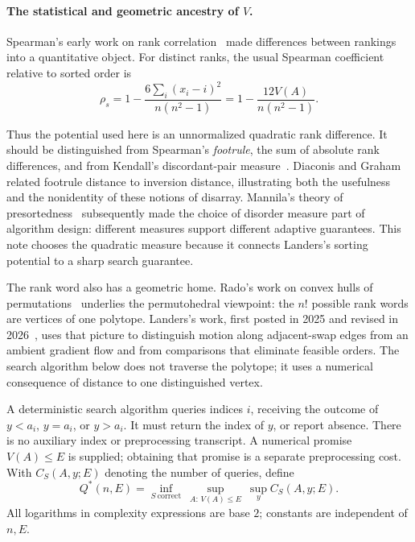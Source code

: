 \documentclass[10pt,letterpaper]{article}
\begin{document}
\begin{samepage}
\paragraph{The statistical and geometric ancestry of $V$.}
Spearman's early work on rank correlation~\cite{spearman} made differences between
rankings into a quantitative object. For distinct ranks, the usual Spearman
coefficient relative to sorted order is
\begin{equation}
 \rho_s=1-\frac{6\sum_i(x_i-i)^2}{n(n^2-1)}
       =1-\frac{12V(A)}{n(n^2-1)}. \label{eq:spearman}
\end{equation}
\end{samepage}
Thus the potential used here is an unnormalized quadratic rank difference. It
should be distinguished from Spearman's \emph{footrule}, the sum of absolute
rank differences, and from Kendall's discordant-pair measure~\cite{kendall}.
Diaconis and Graham~\cite{diaconis} related footrule distance to inversion
distance, illustrating both the usefulness and the nonidentity of these notions
of disarray. Mannila's theory of presortedness~\cite{mannila} subsequently made
the choice of disorder measure part of algorithm design: different measures
support different adaptive guarantees. This note chooses the quadratic measure
because it connects Landers's sorting potential to a sharp search guarantee.

The rank word also has a geometric home. Rado's work on convex hulls of
permutations~\cite{rado} underlies the permutohedral viewpoint: the $n!$ possible
rank words are vertices of one polytope. Landers's work, first posted in 2025
and revised in 2026~\cite{landers}, uses that picture
to distinguish motion along adjacent-swap edges from an ambient gradient flow
and from comparisons that eliminate feasible orders. The search algorithm below
does not traverse the polytope; it uses a numerical consequence of distance to
one distinguished vertex.

A deterministic search algorithm queries indices $i$, receiving the outcome of
$y<a_i$, $y=a_i$, or $y>a_i$. It must return the index of $y$, or report absence.
There is no auxiliary index or preprocessing transcript. A numerical promise $V(A)\leq E$
is supplied; obtaining that promise is a separate preprocessing cost. With $C_S(A,y;E)$
denoting the number of queries, define
\begin{equation}
 Q^*(n,E)=\inf_{S\ \mathrm{correct}}\ \sup_{A:\,V(A)\leq E}\ \sup_y C_S(A,y;E).
 \label{eq:minimax}
\end{equation}
All logarithms in complexity expressions are base $2$; constants are independent of $n,E$.
\end{document}
